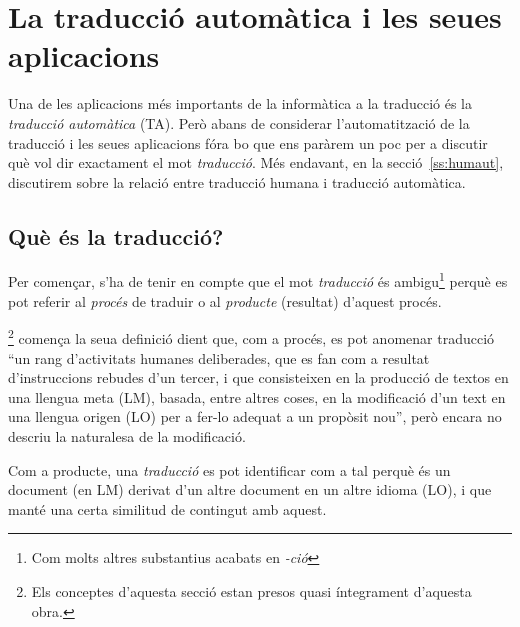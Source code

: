 \chapter[Traducció automàtica i aplicacions]{La traducció automàtica i les seues aplicacions}
\label{se:UTA} \label{se:TiTA} %

Una de les aplicacions més importants de la informàtica a la traducció
és la \emph{traducció automàtica} (TA). Però abans de considerar
l'automatització de la traducció i les seues aplicacions fóra bo que
ens paràrem un poc per a discutir què vol dir exactament el mot
\emph{traducció}. Més endavant, en la secció~\ref{ss:humaut},
discutirem sobre la relació entre traducció humana i traducció
automàtica.

\section{Què és la traducció?}
\label{ss:trad}

Per començar, s'ha de tenir en compte que el mot \emph{traducció} és
ambigu\footnote{Com molts altres substantius acabats en \emph{-ció}}
perquè es pot referir al \emph{procés} de traduir o al \emph{producte}
(resultat) d'aquest procés.

\citet{sager93b}\footnote{Els conceptes d'aquesta secció estan presos
  quasi íntegrament d'aquesta obra.} comença la seua definició dient
que, com a procés, es pot anomenar traducció ``un rang d'activitats
humanes deliberades, que es fan com a resultat d'instruccions rebudes
d'un tercer, i que consisteixen en la producció de textos en una
llengua meta (LM), basada, entre altres coses, en la modificació d'un
text en una llengua origen (LO) per a fer-lo adequat a un propòsit
nou'', però encara no descriu la naturalesa de la modificació.

Com a producte, una \emph{traducció} es pot identificar com a tal
perquè és un document (en LM) derivat d'un altre document en un altre
idioma (LO), i que manté una certa similitud de contingut amb aquest.

